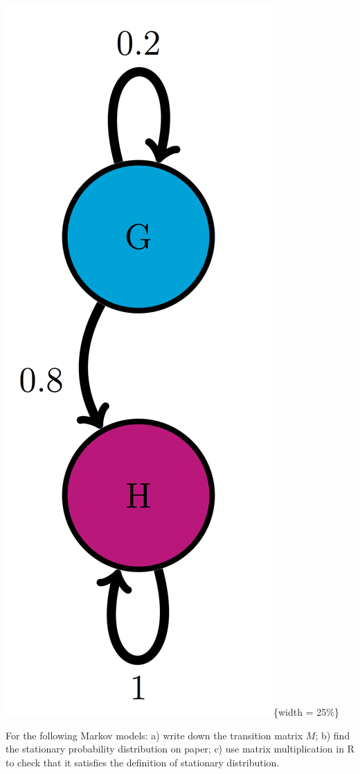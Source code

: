 \documentclass[
  letterpaper,
  DIV=11,
  numbers=noendperiod]{scrreprt}
\begin{document}
\includegraphics{./ch10/GH_trans_diag.png}\{width = 25\%\}

For the following Markov models: a) write down the transition matrix
\(M\); b) find the stationary probability distribution on paper; c) use
matrix multiplication in R to check that it satisfies the definition of
stationary distribution.
\end{document}
